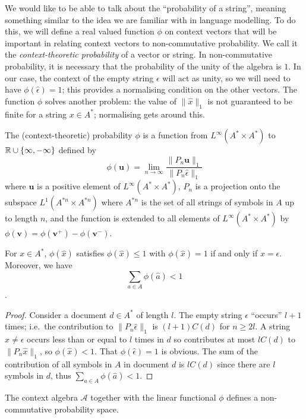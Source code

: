 \documentclass[11pt]{report}
\begin{document}
We would like to be able to talk about the ``probability of a string'', meaning something similar to the idea we are familiar with in language modelling. To do this, we will define a real valued function $\phi$ on context vectors that will be important in relating context vectors to non-commutative probability. We call it the \emph{context-theoretic probability} of a vector or string. In non-commutative probability, it is necessary that the probability of the unity of the algebra is $1$. In our case, the context of the empty string $\epsilon$ will act as unity, so we will need to have $\phi(\hat{\epsilon}) = 1$; this provides a normalising condition on the other vectors. The function $\phi$ solves another problem: the value of $\|\hat{x}\|_1$ is not guaranteed to be finite for a string $x \in A^*$; normalising gets around this.
\begin{defn}[Probability]
The (context-theoretic) probability $\phi$ is a function from $L^\infty(A^*\times A^*)$ to $\mathbb{R}\cup\{\infty,-\infty\}$ defined by
$$\phi(\mathbf{u}) = \lim_{n\rightarrow\infty} \frac{\|P_n\mathbf{u}\|_1}{\|P_n\hat{\epsilon}\|_1}$$
where $\mathbf{u}$ is a positive element of $L^\infty(A^*\times A^*)$, $P_n$ is a projection onto the subspace $L^1(A^{*n}\times A^{*n})$ where $A^{*n}$ is the set of all strings of symbols in $A$ up to length $n$, and the function is extended to all elements of $L^\infty(A^*\times A^*)$ by $\phi(\mathbf{v}) = \phi(\mathbf{v}^+) - \phi(\mathbf{v}^-)$.
\end{defn}

\begin{prop}
For $x \in A^*$, $\phi(\hat{x})$ satisfies $\phi(\hat{x}) \le 1$ with $\phi(\hat{x}) = 1$ if and only if $x = \epsilon$. Moreover, we have
$$\sum_{a \in A} \phi(\hat{a}) < 1$$.
\end{prop}

\begin{proof}
Consider a document $d\in A^*$ of length $l$. The empty string $\epsilon$ ``occurs'' $l+1$ times; i.e.~the contribution to $\|P_n \hat{\epsilon}\|_1$ is $(l+1)C(d)$ for $n \ge 2l$. A string $x \neq \epsilon$ occurs less than or equal to $l$ times in $d$ so contributes at most $lC(d)$ to $\|P_n\hat{x}\|_1$, so $\phi(\hat{x}) < 1$. That $\phi(\hat{\epsilon}) = 1$ is obvious. The sum of the contribution of all symbols in $A$ in document $d$ is $lC(d)$ since there are $l$ symbols in $d$, thus $\sum_{a \in A} \phi(\hat{a}) < 1$.
\end{proof}

\begin{prop}
The context algebra $\mathcal{A}$ together with the linear functional $\phi$ defines a non-commutative probability space.
\end{prop}
\end{document}
